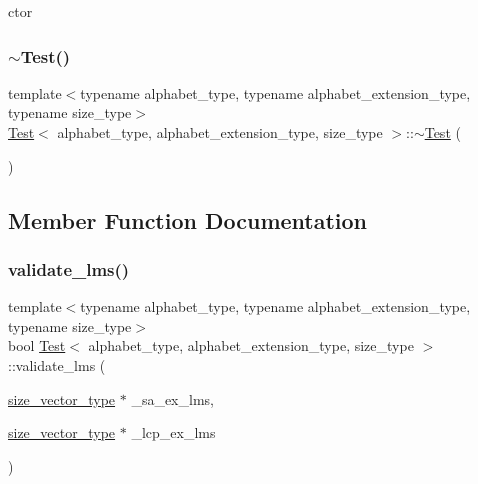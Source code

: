 ctor 

\mbox{\label{class_test_acafab99b8fa6756de9998d16fc9e33f4}} 
\subsubsection{\texorpdfstring{$\sim$\+Test()}{~Test()}}
{\footnotesize\ttfamily template$<$typename alphabet\+\_\+type, typename alphabet\+\_\+extension\+\_\+type, typename size\+\_\+type$>$ \\
\hyperlink{class_test}{Test}$<$ alphabet\+\_\+type, alphabet\+\_\+extension\+\_\+type, size\+\_\+type $>$\+::$\sim$\hyperlink{class_test}{Test} (\begin{DoxyParamCaption}{ }\end{DoxyParamCaption})\hspace{0.3cm}{\ttfamily [inline]}}



\subsection{Member Function Documentation}
\mbox{\label{class_test_ab5d1d239530c9b99ab1732e5d4008b87}} 
\subsubsection{\texorpdfstring{validate\+\_\+lms()}{validate\_lms()}}
{\footnotesize\ttfamily template$<$typename alphabet\+\_\+type, typename alphabet\+\_\+extension\+\_\+type, typename size\+\_\+type$>$ \\
bool \hyperlink{class_test}{Test}$<$ alphabet\+\_\+type, alphabet\+\_\+extension\+\_\+type, size\+\_\+type $>$\+::validate\+\_\+lms (\begin{DoxyParamCaption}\item[{\hyperlink{class_test_a9290f9f05f2aac6555e7366cf214d186}{size\+\_\+vector\+\_\+type} $\ast$}]{\+\_\+sa\+\_\+ex\+\_\+lms,  }\item[{\hyperlink{class_test_a9290f9f05f2aac6555e7366cf214d186}{size\+\_\+vector\+\_\+type} $\ast$}]{\+\_\+lcp\+\_\+ex\+\_\+lms }\end{DoxyParamCaption})\hspace{0.3cm}{\ttfamily [inline]}}



